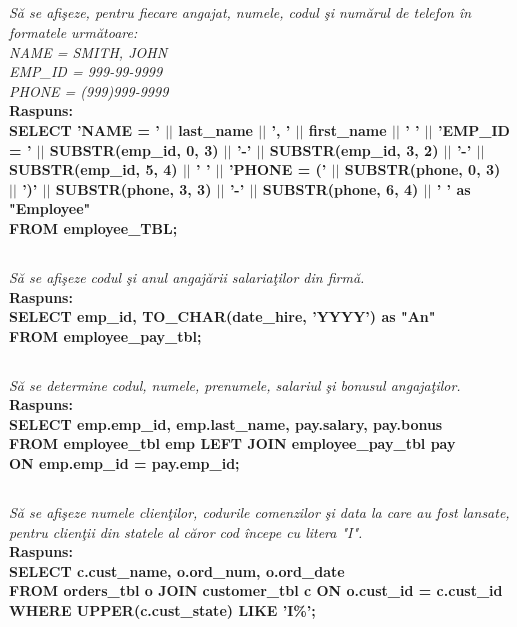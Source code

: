 \documentclass[a4paper,12pt]{article}
\begin{document}
	\subsection{}
	\textit{Să se afişeze, pentru fiecare angajat, numele, codul şi numărul de telefon în
		formatele următoare:\\NAME = SMITH, JOHN\\
		EMP\_ID = 999-99-9999\\
		PHONE = (999)999-9999\\}
	\textbf{Raspuns:\\
		SELECT 'NAME = ' $||$ last\_name $||$ ', ' $||$ first\_name $||$ '   '
		$||$ 'EMP\_ID = ' $||$ SUBSTR(emp\_id, 0, 3) $||$ '-' $||$ SUBSTR(emp\_id, 3, 2) $||$ '-' $||$ SUBSTR(emp\_id, 5, 4) $||$ '   '
		$||$ 'PHONE = (' $||$ SUBSTR(phone, 0, 3) $||$ ')' $||$ SUBSTR(phone, 3, 3) $||$ '-' $||$ SUBSTR(phone, 6, 4) $||$ '   '
		as "Employee"\\
		FROM employee\_TBL;\\}
	
	\subsection{}
	\textit{Să se afişeze codul şi anul angajării salariaţilor din firmă.\\}
	\textbf{Raspuns:\\
	SELECT emp\_id, TO\_CHAR(date\_hire, 'YYYY') as "An"\\
	FROM employee\_pay\_tbl;}
	
	\subsection{}
	\textit{Să se determine codul, numele, prenumele, salariul şi bonusul angajaţilor.\\}
	\textbf{Raspuns:\\SELECT emp.emp\_id, emp.last\_name, pay.salary, pay.bonus\\
		FROM employee\_tbl emp LEFT JOIN employee\_pay\_tbl pay\\
		ON emp.emp\_id = pay.emp\_id;}
	
	\subsection{}
	\textit{Să se afişeze numele clienţilor, codurile comenzilor şi data la care au fost lansate, pentru clienţii din statele al căror cod începe cu litera "I".\\}
	\textbf{Raspuns:\\SELECT c.cust\_name, o.ord\_num, o.ord\_date\\
		FROM orders\_tbl o JOIN customer\_tbl c ON o.cust\_id = c.cust\_id\\
		WHERE UPPER(c.cust\_state) LIKE 'I\%';}
	
\end{document}
